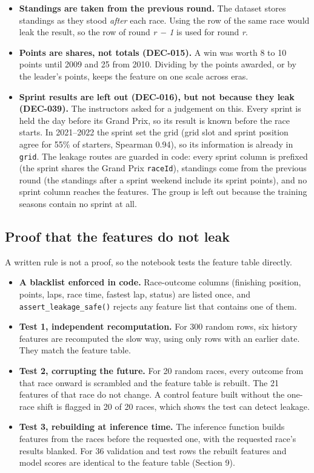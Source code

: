 \documentclass[11pt,a4paper]{article}
\begin{document}
\begin{itemize}
\item \textbf{Standings are taken from the previous round.} The dataset stores standings as they stood \emph{after} each race. Using the row of the same race would leak the result, so the row of round \emph{r − 1} is used for round \emph{r}.
\item \textbf{Points are shares, not totals (DEC-015).} A win was worth 8 to 10 points until 2009 and 25 from 2010. Dividing by the points awarded, or by the leader's points, keeps the feature on one scale across eras.
\item \textbf{Sprint results are left out (DEC-016), but not because they leak (DEC-039).} The instructors asked for a judgement on this. Every sprint is held the day before its Grand Prix, so its result is known before the race starts. In 2021–2022 the sprint set the grid (grid slot and sprint position agree for 55\% of starters, Spearman 0.94), so its information is already in \texttt{grid}. The leakage routes are guarded in code: every sprint column is prefixed (the sprint shares the Grand Prix \texttt{raceId}), standings come from the previous round (the standings after a sprint weekend include its sprint points), and no sprint column reaches the features. The group is left out because the training seasons contain no sprint at all.
\end{itemize}

\subsection{Proof that the features do not leak}

A written rule is not a proof, so the notebook tests the feature table directly.

\begin{itemize}
\item \textbf{A blacklist enforced in code.} Race-outcome columns (finishing position, points, laps, race time, fastest lap, status) are listed once, and \texttt{assert\_\allowbreak{}leakage\_\allowbreak{}safe()} rejects any feature list that contains one of them.
\item \textbf{Test 1, independent recomputation.} For 300 random rows, six history features are recomputed the slow way, using only rows with an earlier date. They match the feature table.
\item \textbf{Test 2, corrupting the future.} For 20 random races, every outcome from that race onward is scrambled and the feature table is rebuilt. The 21 features of that race do not change. A control feature built without the one-race shift is flagged in 20 of 20 races, which shows the test can detect leakage.
\item \textbf{Test 3, rebuilding at inference time.} The inference function builds features from the races before the requested one, with the requested race's results blanked. For 36 validation and test rows the rebuilt features and model scores are identical to the feature table (Section 9).
\end{itemize}
\end{document}
